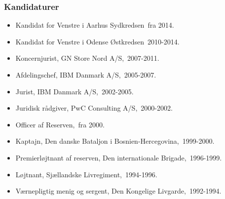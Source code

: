 \documentclass[11pt, a4paper]{awesome-cv}
\begin{document}
\begin{cvletter}
\subsubsection*{Kandidaturer}
\begin{itemize}
\item Kandidat for Venstre i Aarhus Sydkredsen fra 2014.
\item Kandidat for Venstre i Odense Østkredsen 2010-2014.
\end{itemize}
\begin{itemize}
\item Koncernjurist, GN Store Nord A/S, 2007-2011.
\item Afdelingschef, IBM Danmark A/S, 2005-2007.
\item Jurist, IBM Danmark A/S, 2002-2005.
\item Juridisk rådgiver, PwC Consulting A/S, 2000-2002.
\item Officer af Reserven, fra 2000.
\item Kaptajn, Den danske Bataljon i Bosnien-Hercegovina, 1999-2000.
\item Premierløjtnant af reserven, Den internationale Brigade, 1996-1999.
\item Løjtnant, Sjællandske Livregiment, 1994-1996.
\item Værnepligtig menig og sergent, Den Kongelige Livgarde, 1992-1994.
\end{itemize}
\end{cvletter}
\end{document}
